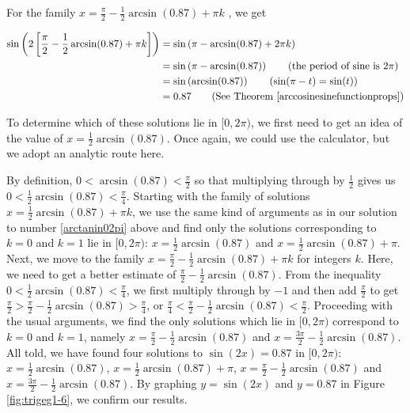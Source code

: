 {\begin{enumerate}
For the family $x =\frac{\pi}{2} -  \frac{1}{2}\arcsin(0.87) + \pi k$ , we get

\begin{align*}
\sin\left(2\left[\frac{\pi}{2} - \frac{1}{2} \arcsin(0.87) + \pi k\right]\right)  &  =  \sin\left(\pi - \arcsin(0.87) + 2\pi k\right) \\			& =   \sin\left(\pi - \arcsin(0.87)\right)  \tag*{(the period of sine is $2\pi$)} \\
	& =   \sin\left(\arcsin(0.87)\right)  \tag*{($\sin(\pi - t) = \sin(t)$)} \\
	& =  0.87 \tag*{(See Theorem  \ref{arccosinesinefunctionprops})}
\end{align*}

\drawexampleline

To determine which of these solutions lie in $[0,2\pi)$, we first need to get an idea of the value of $x=\frac{1}{2} \arcsin(0.87)$.  Once again, we could use the calculator, but we adopt an analytic route here.  

By definition, $0 < \arcsin(0.87) < \frac{\pi}{2}$ so that multiplying through by $\frac{1}{2}$ gives us $0 < \frac{1}{2} \arcsin(0.87) < \frac{\pi}{4}$.  Starting with the family of solutions $x = \frac{1}{2} \arcsin(0.87) + \pi k$, we use the same kind of arguments as in our solution to number \ref{arctanin02pi} above and find only the solutions corresponding to $k =0$ and $k=1$ lie in $[0,2\pi)$:  $x = \frac{1}{2} \arcsin(0.87)$ and $x = \frac{1}{2} \arcsin(0.87) + \pi$.  Next, we move to the family $x =\frac{\pi}{2} -  \frac{1}{2}\arcsin(0.87) + \pi k$ for integers $k$. Here, we need to get a better estimate of $\frac{\pi}{2} - \frac{1}{2} \arcsin(0.87)$.  From the inequality $0 < \frac{1}{2}\arcsin(0.87) < \frac{\pi}{4}$, we first multiply through by $-1$ and then add $\frac{\pi}{2}$ to get $\frac{\pi}{2} > \frac{\pi}{2} -\frac{1}{2} \arcsin(0.87) >  \frac{\pi}{4}$, or $\frac{\pi}{4} < \frac{\pi}{2} -\frac{1}{2} \arcsin(0.87) < \frac{\pi}{2}$.  Proceeding with the usual arguments, we find the only solutions which lie in $[0,2\pi)$ correspond to $k = 0$ and $k=1$, namely $x =\frac{\pi}{2} -  \frac{1}{2}\arcsin(0.87)$ and  $x = \frac{3\pi}{2} - \frac{1}{2}\arcsin(0.87)$. All told, we have found four solutions to $\sin(2x) = 0.87$ in $[0,2\pi)$:  $x =\frac{1}{2} \arcsin(0.87)$, $x=\frac{1}{2} \arcsin(0.87) + \pi$, $x =\frac{\pi}{2} -  \frac{1}{2}\arcsin(0.87)$ and  $x = \frac{3\pi}{2} - \frac{1}{2}\arcsin(0.87)$. By graphing $y = \sin(2x)$ and $y = 0.87$ in Figure \ref{fig:trigeg1-6}, we confirm our results.


\end{enumerate}
}

